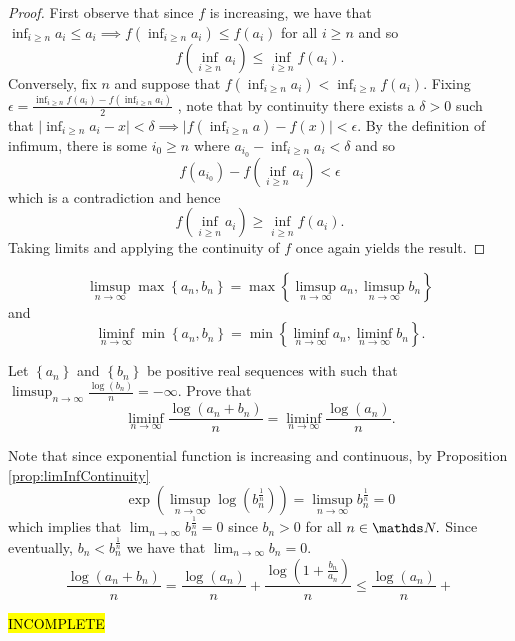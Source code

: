 \begin{proof}
First observe that since $f$ is increasing, we have that $\inf_{i\geq n}a_{i}\leq a_{i}\implies f\left(\inf_{i\geq n}a_{i}\right)\leq f\left(a_{i}\right)$
for all $i\geq n$ and so
\[
f\left(\inf_{i\geq n}a_{i}\right)\leq\inf_{i\geq n}f\left(a_{i}\right).
\]
Conversely, fix $n$ and suppose that $f\left(\inf_{i\geq n}a_{i}\right)<\inf_{i\geq n}f\left(a_{i}\right)$.
Fixing $\epsilon=\frac{\inf_{i\geq n}f\left(a_{i}\right)-f\left(\inf_{i\geq n}a_{i}\right)}{2}$
, note that by continuity there exists a $\delta>0$ such that $\lvert\inf_{i\geq n}a_{i}-x\rvert<\delta\implies\lvert f\left(\inf_{i\geq n}a\right)-f\left(x\right)\rvert<\epsilon$.
By the definition of infimum, there is some $i_{0}\geq n$ where $a_{i_{0}}-\inf_{i\geq n}a_{i}<\delta$
and so 
\[
f\left(a_{i_{0}}\right)-f\left(\inf_{i\geq n}a_{i}\right)<\epsilon
\]
which is a contradiction and hence 
\[
f\left(\inf_{i\geq n}a_{i}\right)\geq\inf_{i\geq n}f\left(a_{i}\right).
\]
Taking limits and applying the continuity of $f$ once again yields
the result.
\end{proof}
\begin{prop}
\[
\limsup_{n\to\infty}\max\left\{ a_{n},b_{n}\right\} =\max\left\{ \limsup_{n\to\infty}a_{n},\limsup_{n\to\infty}b_{n}\right\} 
\]
 and 
\[
\liminf_{n\to\infty}\min\left\{ a_{n},b_{n}\right\} =\min\left\{ \liminf_{n\to\infty}a_{n},\liminf_{n\to\infty}b_{n}\right\} .
\]
\end{prop}

\begin{xca}
Let $\left\{ a_{n}\right\} $ and $\left\{ b_{n}\right\} $ be positive
real sequences with such that $\limsup_{n\to\infty}\frac{\log\left(b_{n}\right)}{n}=-\infty$.
Prove that 
\[
\liminf_{n\to\infty}\frac{\log\left(a_{n}+b_{n}\right)}{n}=\liminf_{n\to\infty}\frac{\log\left(a_{n}\right)}{n}.
\]
\end{xca}

\begin{sol*}
Note that since exponential function is increasing and continuous,
by Proposition \ref{prop:limInfContinuity}
\[
\exp\left(\limsup_{n\to\infty}\log\left(b_{n}^{\frac{1}{n}}\right)\right)=\limsup_{n\to\infty}b_{n}^{\frac{1}{n}}=0
\]
which implies that $\lim_{n\to\infty}b_{n}^{\frac{1}{n}}=0$ since
$b_{n}>0$ for all $n\in\N.$ Since eventually, $b_{n}<b_{n}^{\frac{1}{n}}$
we have that $\lim_{n\to\infty}b_{n}=0.$ 
\[
\frac{\log\left(a_{n}+b_{n}\right)}{n}=\frac{\log\left(a_{n}\right)}{n}+\frac{\log\left(1+\frac{b_{n}}{a_{n}}\right)}{n}\leq\frac{\log\left(a_{n}\right)}{n}+
\]

\hl{INCOMPLETE}
\end{sol*}

